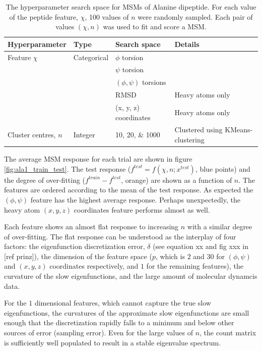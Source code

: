 \begin{table}
    \caption{The hyperparameter search space for MSMs of Alanine dipeptide. For each value of the peptide feature, $\chi$, 100 values of $n$ were randomly sampled. Each pair of values $(\chi, n)$ was used to fit and score a MSM.}
    \centering
    \begin{tabularx}{0.9\textwidth}{ |>{\raggedright\arraybackslash}X|l|l| >{\raggedright\arraybackslash}X | } 
    \hline
    \textbf{Hyperparameter} & \textbf{Type} & \textbf{Search space} & \textbf{Details} \\
     \hline\hline
    Feature $\chi$ & Categorical &  $\phi$ torsion &  \\
    & & $\psi$ torsion &  \\ 
    & & $(\phi, \psi)$ torsions &  \\ 
    & & RMSD &  Heavy atoms only\\ 
    & & (x, y, z) coordinates & Heavy atoms only  \\
    \hline 
    Cluster centres, $n$ & Integer & \numlist[list-final-separator = { ... }]{10;20;1000} & Clustered using KMeans-clustering \\
     \hline
    \end{tabularx}
    \label{tab:ala2searchspace}
\end{table}


The average MSM response for each trial are shown in figure \ref{fig:ala1_train_test}.  The test response ($f^{test} = f(\chi, n; x^{test})$, blue points) and the degree of over-fitting ($f^{train} - f^{test}$, orange) are shown as a function of $n$. The  features are ordered according to the  mean of the test response. As expected the  $(\phi, \psi)$ feature has the highest average response. Perhaps unexpectedly, the heavy atom $(x,y,z)$ coordinates feature performs almost as well. 

Each feature shows an almost flat response to increasing $n$ with a similar degree of over-fitting. The flat response can be understood as the interplay of four factors: the eigenfunction discretization error, $\delta$ (see equation xx and fig xxx in [ref prinz]), the dimension of the feature space ($p$, which is $2$ and $30$ for $(\phi, \psi)$ and $(x,y,z)$ coordinates respectively, and $1$ for the remaining features),  the curvature of the slow eigenfunctions, and the large amount of molecular dynamcis data. 

For the $1$ dimensional features, which cannot capture the true slow eigenfunctions, the curvatures of the approximate slow eigenfunctions are small enough that the discretization rapidly falls to a minimum and below other sources of error (sampling error). Even for the large values of $n$, the count matrix is sufficiently well populated to result in a stable eigenvalue spectrum. 

